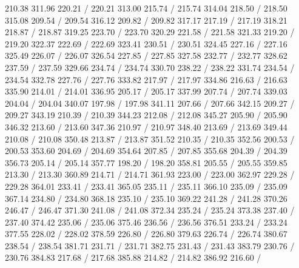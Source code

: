 { 210.38 311.96 220.21 /
 220.21 313.00 215.74 /
 215.74 314.04 218.50 /
 218.50 315.08 209.54 /
 209.54 316.12 209.82 /
 209.82 317.17 217.19 /
 217.19 318.21 218.87 /
 218.87 319.25 223.70 /
 223.70 320.29 221.58 /
 221.58 321.33 219.20 /
 219.20 322.37 222.69 /
 222.69 323.41 230.51 /
 230.51 324.45 227.16 /
 227.16 325.49 226.07 /
 226.07 326.54 227.85 /
 227.85 327.58 232.77 /
 232.77 328.62 237.59 /
 237.59 329.66 234.74 /
 234.74 330.70 238.22 /
 238.22 331.74 234.54 /
 234.54 332.78 227.76 /
 227.76 333.82 217.97 /
 217.97 334.86 216.63 /
 216.63 335.90 214.01 /
 214.01 336.95 205.17 /
 205.17 337.99 207.74 /
 207.74 339.03 204.04 /
 204.04 340.07 197.98 /
 197.98 341.11 207.66 /
 207.66 342.15 209.27 /
 209.27 343.19 210.39 /
 210.39 344.23 212.08 /
 212.08 345.27 205.90 /
 205.90 346.32 213.60 /
 213.60 347.36 210.97 /
 210.97 348.40 213.69 /
 213.69 349.44 210.08 /
 210.08 350.48 213.87 /
 213.87 351.52 210.35 /
 210.35 352.56 200.53 /
 200.53 353.60 204.69 /
 204.69 354.64 207.85 /
 207.85 355.68 204.39 /
 204.39 356.73 205.14 /
 205.14 357.77 198.20 /
 198.20 358.81 205.55 /
 205.55 359.85 213.30 /
 213.30 360.89 214.71 /
 214.71 361.93 223.00 /
 223.00 362.97 229.28 /
 229.28 364.01 233.41 /
 233.41 365.05 235.11 /
 235.11 366.10 235.09 /
 235.09 367.14 234.80 /
 234.80 368.18 235.10 /
 235.10 369.22 241.28 /
 241.28 370.26 246.47 /
 246.47 371.30 241.08 /
 241.08 372.34 235.24 /
 235.24 373.38 237.40 /
 237.40 374.42 235.06 /
 235.06 375.46 236.56 /
 236.56 376.51 233.24 /
 233.24 377.55 228.02 /
 228.02 378.59 226.80 /
 226.80 379.63 226.74 /
 226.74 380.67 238.54 /
 238.54 381.71 231.71 /
 231.71 382.75 231.43 /
 231.43 383.79 230.76 /
 230.76 384.83 217.68 /
 217.68 385.88 214.82 /
 214.82 386.92 216.60 /
}

